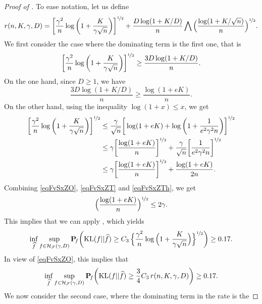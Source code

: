 \begin{proof}[Proof of ]
	To ease notation, let us define
	\begin{equation}
	r(n,K,\gamma,D) = \bigg[\frac{\gamma^2}{n}
	\log\bigg(1+\frac{K}{\gamma\sqrt{n}}\bigg)\bigg]^{\nicefrac12}
	+ \frac{D\log(1+K/D)}{n}\bigwedge \Big(\frac{\log(1+K/\sqrt{n})}{n}\Big)^{\nicefrac12}.
	\end{equation}
	We first consider the case where the dominating term is the first one, that is 
	\begin{equation}\label{eqFvSxZO}
	\bigg[\frac{\gamma^2}{n} \log\bigg(1+\frac{K}{\gamma\sqrt{n}}\bigg)\bigg]^{\nicefrac12}
	\ge \frac{ 3 D\log(1+K/D)}{n}.
	\end{equation}
	On the one hand, since $D\ge 1$, we have
	\begin{equation}\label{eqFvSxZT}
	\frac{ 3D\log(1+K/D)}{n}\ge \frac{ \log(1+eK)}{n}.
	\end{equation}
	On the other hand, using the inequality $\log(1+x)\le x$, we get
	\begin{align}
	\bigg[\frac{\gamma^2}{n} \log\bigg(1+\frac{K}{\gamma\sqrt{n}}\bigg)\bigg]^{\nicefrac12}
	&\le \frac{\gamma}{\sqrt{n}}\bigg[\log(1+eK)+\log\bigg(1+\frac{1}{e^2\gamma^2n}\bigg)\bigg]^{\nicefrac12}\\
	&\le \gamma\bigg[\frac{\log(1+eK)}{n}\bigg]^{\nicefrac12}+\frac{\gamma}{\sqrt{n}}\bigg[\frac{1}{e^2\gamma^2n}\bigg]^{\nicefrac12}\\
	&\le \gamma\bigg[\frac{\log(1+eK)}{n}\bigg]^{\nicefrac12}+\frac{\log (1+eK)}{2n}.\label{eqFvSxZTh}
	\end{align}
	Combining \eqref{eqFvSxZO}, \eqref{eqFvSxZT} and \eqref{eqFvSxZTh}, we get
	\begin{equation}
	\Big(\frac{\log(1+eK)}{n}\Big)^{\nicefrac12}\le 2\gamma.
	\end{equation}
	This implies that we can apply , which yields
	\begin{equation}
	\inf_{\widehat f}\sup_{f \in \mathcal H_\mathcal F(\gamma,D)}\mathbf P\!_{f}\bigg({\rm KL}(f||\widehat f)\geq
	C_3\,\Big\{{\frac{\gamma^2}n\log\Big(1+\frac{K}{\gamma\sqrt{n}}\Big)}\Big\}^{\nicefrac12}\bigg)\geq 0.17.
	\end{equation}
	In view of \eqref{eqFvSxZO}, this implies that
	\begin{equation}\label{eqFvSxZFr}
	\inf_{\widehat f}\sup_{f \in \mathcal H_\mathcal F(\gamma,D)}\mathbf P\!_{f}\bigg({\rm KL}(f||\widehat f)\geq
	\frac34C_3\,r(n,K,\gamma,D)\bigg)\geq 0.17.
	\end{equation}
	We now consider the second case, where the dominating term in the rate is the 

\end{proof}
